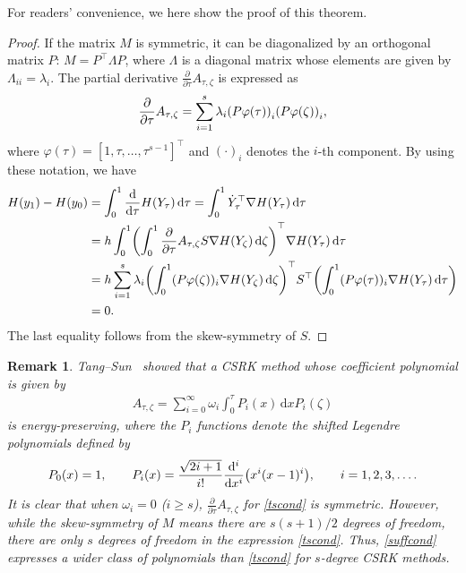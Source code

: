 \documentclass[final,leqno,onefignum,onetabnum]{siamltex1213}
\DeclarePairedDelimiter\paren{\lparen}{\rparen}
\newtheorem{remark}{Remark}
\begin{document}
For readers' convenience, we here show the proof of this theorem.
\begin{proof}
If the matrix $M$ is symmetric,
it can be diagonalized by an orthogonal matrix $P$: $M = P^\top \Lambda P$,
where $\Lambda$ is a diagonal matrix 
whose elements are given by $\Lambda_{ii}=\lambda_i$.
The partial derivative $\frac{\partial}{\partial\tau}A_{\tau,\zeta}$ 
is expressed as
\begin{align*}
\frac{\partial}{\partial \tau} A_{\tau,\zeta}
=
\sum_{i=1}^s \lambda_i \paren*{P\varphi (\tau)}_i \paren*{P\varphi (\zeta)}_i ,
\end{align*}
where $\varphi (\tau) = [1,\tau,\dots,\tau^{s-1}]^\top$ and $(\cdot)_i$
denotes the $i$-th component.
By using these notation,
we have
\begin{align*}
H(y_1)-H(y_0)
&=
\int_0^1 \frac{\mathrm d}{{\mathrm d} \tau} H(Y_\tau)\,{\mathrm d}\tau
=\int_0^1 \dot{Y}_\tau^\top \nabla H (Y_\tau)\,{\mathrm d}\tau \\
&=
h\int_0^1 \paren*{\int_0^1 \frac{\partial}{\partial \tau}
A_{\tau,\zeta} S\nabla H(Y_\zeta)\,{\mathrm d}\zeta} ^\top \nabla H (Y_\tau)\,{\mathrm d}\tau \\
&=
h\sum_{i=1}^s \lambda_i
\paren*{\int_0^1 (P\varphi (\zeta))_i \nabla H(Y_\zeta)\,{\mathrm d}\zeta}^\top S^\top
\paren*{\int_0^1 (P\varphi (\tau))_i \nabla H(Y_\tau)\,{\mathrm d}\tau} \\
&=0.
\end{align*}
The last equality follows from the skew-symmetry of $S$.
\end{proof}

\begin{remark}
Tang--Sun~\cite{ta14} showed that 
a CSRK method whose coefficient polynomial is given by
\begin{align}
A_{\tau,\zeta} = \sum_{i=0}^\infty \omega_i
\int_0^\tau P_i (x)\,{\mathrm d} x P_i(\zeta)
\label{tscond}
\end{align}
is energy-preserving,
where the $P_i$ functions denote the shifted Legendre polynomials
defined by
\begin{align*}
P_0 (x) = 1, \qquad
P_i(x) = \frac{\sqrt{2i+1}}{i!} \frac{{\mathrm d} ^i}{{\mathrm d} x^i}
\paren*{x^i(x-1)^i}, \qquad
i=1,2,3,\dots .
\end{align*}  
It is clear that when $\omega_i=0$ ($i\geq s$),
$\frac{\partial}{\partial\tau}A_{\tau,\zeta}$ for \eqref{tscond}
is symmetric.
However, 
while the skew-symmetry of $M$ means there are $s(s+1)/2$ degrees of freedom,
there are only $s$ degrees of freedom in the expression \eqref{tscond}.
Thus, \autoref{suffcond} expresses a wider class of polynomials than \eqref{tscond}
for $s$-degree CSRK methods.
\end{remark}
\end{document}

